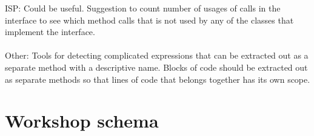 \noindent ISP: Could be useful. Suggestion to count number of usages of calls in the interface to see which method calls that is not used by any of the classes that implement the interface. \\\\

\noindent Other: Tools for detecting complicated expressions that can be extracted out as a separate method with a descriptive name. Blocks of code should be extracted out as separate methods so that lines of code that belongs together has its own scope. 
\clearpage
\section{Workshop schema}
\label{workshop-schema}


